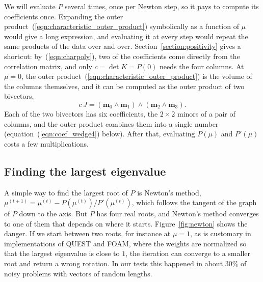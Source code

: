\documentclass{birkjour}
\theoremstyle{definition}
\theoremstyle{remark}
\numberwithin{equation}{section}
\begin{document}
We will evaluate $P$ several times, once per Newton step, so it pays to compute its coefficients once. Expanding the outer product~(\ref{eqn:characteristic_outer_product}) symbolically as a function of $\mu$ would give a long expression, and evaluating it at every step would repeat the same products of the data over and over. Section~\ref{section:positivity} gives a shortcut: by~(\ref{eqn:charpoly}), two of the coefficients come directly from the correlation matrix, and only $c = \det K = P(0)$ needs the four columns. At $\mu = 0$, the outer product~(\ref{eqn:characteristic_outer_product}) is the volume of the columns themselves, and it can be computed as the outer product of two bivectors,
\begin{equation}
\label{eqn:c}
c\, J = (\mathbf m_0 \wedge \mathbf m_1) \wedge (\mathbf m_2 \wedge \mathbf m_3).
\end{equation}
Each of the two bivectors has six coefficients, the $2 \times 2$ minors of a pair of columns, and the outer product combines them into a single number (equation~(\ref{eqn:coef_wedge4}) below). After that, evaluating $P(\mu)$ and $P'(\mu)$ costs a few multiplications.

\subsection{Finding the largest eigenvalue}

A simple way to find the largest root of $P$ is Newton's method, $\mu^{(t+1)} = \mu^{(t)} - P(\mu^{(t)}) / P'(\mu^{(t)})$, which follows the tangent of the graph of $P$ down to the axis. But $P$ has four real roots, and Newton's method converges to one of them that depends on where it starts. Figure~\ref{fig:newton} shows the danger. If we start between two roots, for instance at $\mu = 1$, as is customary in implementations of QUEST and FOAM, where the weights are normalized so that the largest eigenvalue is close to $1$, the iteration can converge to a smaller root and return a wrong rotation. In our tests this happened in about $30\%$ of noisy problems with vectors of random lengths.
\end{document}
